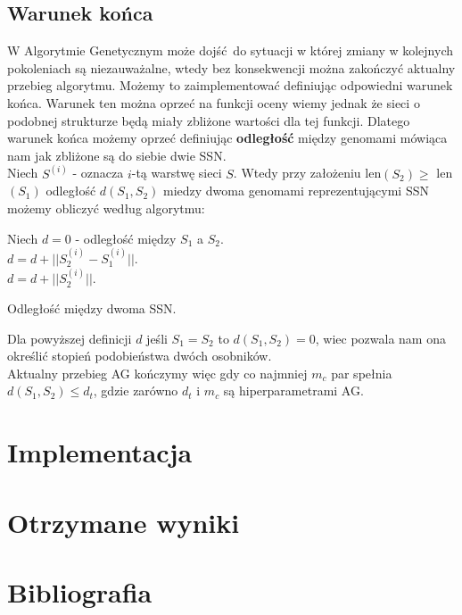 \documentclass{article}
\begin{document}
\subsection{Warunek końca}
W Algorytmie Genetycznym może dojść do sytuacji w której zmiany w kolejnych pokoleniach są
niezauważalne, wtedy bez konsekwencji można zakończyć aktualny przebieg algorytmu. Możemy to
zaimplementować definiując odpowiedni warunek końca. Warunek ten można oprzeć na funkcji oceny
wiemy jednak że sieci o podobnej strukturze będą miały zbliżone wartości dla tej funkcji.
Dlatego warunek końca możemy oprzeć definiując \textbf{odległość} między genomami mówiąca nam
jak zbliżone są do siebie dwie SSN.\\
Niech $S^{(i)}$ - oznacza $i$-tą warstwę sieci $S$. Wtedy przy założeniu 
len$(S_2) \geq$ len$(S_1)$
odległość $d(S_1, S_2)$ miedzy dwoma genomami reprezentującymi SSN możemy obliczyć według 
algorytmu:

\begin{algorithm}[H]
	Niech $d = 0$ - odległość między $S_1$ a $S_2$.\\
	 {
		$d = d + ||S_2^{(i)} - S_1^{(i)}||$.\\
	}
	 {
		$d = d + ||S_2^{(i)}||$.\\
	}
	\caption{Odległość między dwoma SSN.}
\end{algorithm}

Dla powyższej definicji $d$ jeśli $S_1 = S_2$ to $d(S_1, S_2) = 0$, wiec pozwala nam ona określić
stopień podobieństwa dwóch osobników.\\
Aktualny przebieg AG kończymy więc gdy co najmniej $m_c$ par spełnia $d(S_1, S_2) \leq d_t$,
gdzie zarówno $d_t$ i $m_c$ są hiperparametrami AG.


\section{Implementacja}



\section{Otrzymane wyniki}

\section{Bibliografia}

\printbibliography
\end{document}
